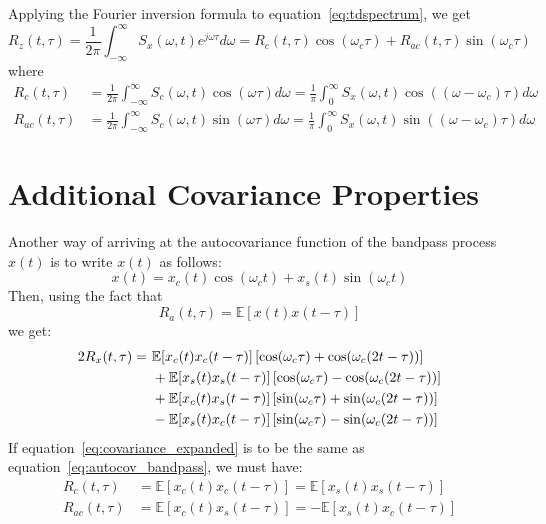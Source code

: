 \documentclass[12pt]{article}
\begin{document}
Applying the Fourier inversion formula to equation~\eqref{eq:tdspectrum}, we get
\begin{equation}
R_z(t, \tau) = \frac{1}{2\pi} \int_{-\infty}^{\infty} S_x(\omega, t) e^{j\omega\tau} d\omega = R_c(t, \tau) \cos(\omega_c \tau) + R_{ac}(t, \tau) \sin(\omega_c \tau)
\label{eq:autocov_bandpass}
\end{equation}
where
\begin{align}
R_c(t, \tau) &= \frac{1}{2\pi} \int_{-\infty}^{\infty} S_c(\omega, t) \cos(\omega \tau) d\omega = \frac{1}{\pi} \int_0^{\infty} S_x(\omega, t) \cos((\omega - \omega_c)\tau) d\omega \label{eq:Rc} \\
R_{ac}(t, \tau) &= \frac{1}{2\pi} \int_{-\infty}^{\infty} S_c(\omega, t) \sin(\omega \tau) d\omega = \frac{1}{\pi} \int_0^{\infty} S_x(\omega, t) \sin((\omega - \omega_c)\tau) d\omega \label{eq:Rac}
\end{align}

\section{Additional Covariance Properties}
Another way of arriving at the autocovariance function of the bandpass process $x(t)$ is to write $x(t)$ as follows:
\begin{equation}
x(t) = x_c(t) \cos(\omega_c t) + x_s(t) \sin(\omega_c t)
\label{eq:bandpass_decomp}
\end{equation}
Then, using the fact that
\begin{equation}
R_a(t, \tau) = \mathbb{E}[x(t)x(t-\tau)]
\label{eq:Ra}
\end{equation}
we get:
\begin{align}
2R_x(t, \tau) =\ & \mathbb{E}[x_c(t)x_c(t-\tau)] \left[\cos(\omega_c \tau) + \cos(\omega_c (2t-\tau))\right] \notag \\
&+ \mathbb{E}[x_s(t)x_s(t-\tau)] \left[\cos(\omega_c \tau) - \cos(\omega_c (2t-\tau))\right] \notag \\
&+ \mathbb{E}[x_c(t)x_s(t-\tau)] \left[\sin(\omega_c \tau) + \sin(\omega_c (2t-\tau))\right] \notag \\
&- \mathbb{E}[x_s(t)x_c(t-\tau)] \left[\sin(\omega_c \tau) - \sin(\omega_c (2t-\tau))\right]
\label{eq:covariance_expanded}
\end{align}
If equation~\eqref{eq:covariance_expanded} is to be the same as equation~\eqref{eq:autocov_bandpass}, we must have:
\begin{align}
R_c(t, \tau) &= \mathbb{E}[x_c(t)x_c(t-\tau)] = \mathbb{E}[x_s(t)x_s(t-\tau)] \label{eq:Rc_xc_xs} \\
R_{ac}(t, \tau) &= \mathbb{E}[x_c(t)x_s(t-\tau)] = -\mathbb{E}[x_s(t)x_c(t-\tau)] \label{eq:Rac_xc_xs}
\end{align}
\end{document}
